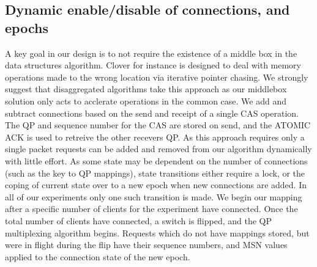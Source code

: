 \subsection{Dynamic enable/disable of connections, and epochs} A key goal in our
design is to not require the existence of a middle box in the data structures
algorithm. Clover for instance is designed to deal with memory operations made
to the wrong location via iterative pointer chasing. We strongly suggest that
disaggregated algorithms take this approach as our middlebox solution only acts
to acclerate operations in the common case. We add and subtract connections
based on the send and receipt of a single CAS operation. The QP and sequence
number for the CAS are stored on send, and the ATOMIC ACK is used to retreive
the other recevers QP. As this approach requires only a single packet requests
can be added and removed from our algorithm dynamically with little effort. As
some state may be dependent on the number of connections (such as the key to QP
mappings), state transitions either require a lock, or the coping of current
state over to a new epoch when new connections are added. In all of our
experiments only one such transition is made. We begin our mapping after a
specific number of clients for the experiment have connected. Once the total
number of clients have connected, a switch is flipped, and the QP multiplexing
algorithm begins. Requests which do not have mappings stored, but were in flight
during the flip have their sequence numbers, and MSN values applied to the
connection state of the new epoch.

